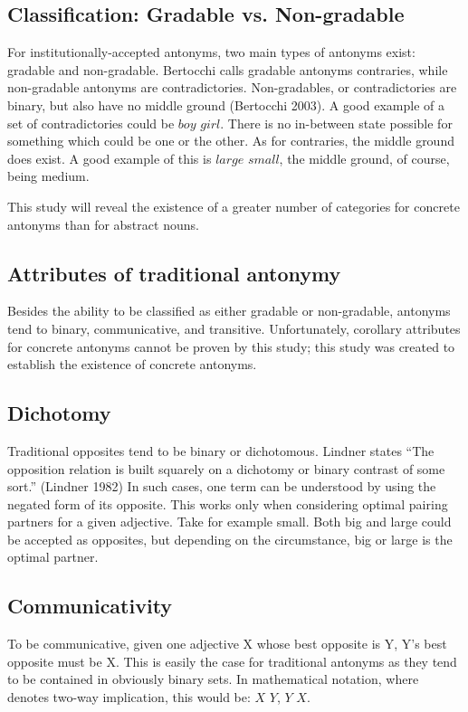 \subsection {Classification: Gradable vs. Non-gradable} For institutionally-accepted antonyms, two main types of antonyms exist: gradable and non-gradable. Bertocchi calls gradable antonyms contraries, while non-gradable antonyms are contradictories.   Non-gradables, or contradictories are binary, but also have no middle ground (Bertocchi 2003).  A good example of a set of contradictories could be $boy$ \opp $girl$.  There is no in-between state possible for something which could be one or the other.  As for contraries, the middle ground does exist.  A good example of this is $large$ \opp $small$, the middle ground, of course, being medium.  

This study will reveal the existence of a greater number of categories for concrete antonyms than for abstract nouns. 

\subsection {Attributes of traditional antonymy} Besides the ability to be classified as either gradable or non-gradable, antonyms tend to binary, communicative, and transitive.  Unfortunately, corollary attributes for concrete antonyms cannot be proven by this study; this study was created to establish the existence of concrete antonyms.

\subsection {Dichotomy} Traditional opposites tend to be binary or dichotomous.  Lindner states “The opposition relation is built squarely on a dichotomy or binary contrast of some sort.” (Lindner 1982) In such cases, one term can be understood by using the negated form of its opposite.  This works only when considering optimal pairing partners for a given adjective.  Take for example small.  Both big and large could be accepted as opposites, but depending on the circumstance, big or large is the optimal partner.

\subsection {Communicativity} To be communicative, given one adjective X whose best opposite is Y, Y’s best opposite must be X.  This is easily the case for traditional antonyms as they tend to be contained in obviously binary sets. In mathematical notation, where  denotes two-way implication, this would be: $X$ \opp $Y$, $Y$ \opp $X$.


